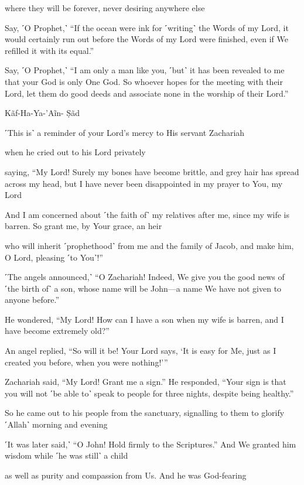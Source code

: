 where they will be forever, never desiring anywhere else

Say, ˹O Prophet,˺ “If the ocean were ink for ˹writing˺ the Words of my Lord, it would certainly run out before the Words of my Lord were finished, even if We refilled it with its equal.”

Say, ˹O Prophet,˺ “I am only a man like you, ˹but˺ it has been revealed to me that your God is only One God. So whoever hopes for the meeting with their Lord, let them do good deeds and associate none in the worship of their Lord.”

Kãf-Ha-Ya-’Aĩn- Ṣãd

˹This is˺ a reminder of your Lord’s mercy to His servant Zachariah

when he cried out to his Lord privately

saying, “My Lord! Surely my bones have become brittle, and grey hair has spread across my head, but I have never been disappointed in my prayer to You, my Lord

And I am concerned about ˹the faith of˺ my relatives after me, since my wife is barren. So grant me, by Your grace, an heir

who will inherit ˹prophethood˺ from me and the family of Jacob, and make him, O Lord, pleasing ˹to You˺!”

˹The angels announced,˺ “O Zachariah! Indeed, We give you the good news of ˹the birth of˺ a son, whose name will be John—a name We have not given to anyone before.”

He wondered, “My Lord! How can I have a son when my wife is barren, and I have become extremely old?”

An angel replied, “So will it be! Your Lord says, ‘It is easy for Me, just as I created you before, when you were nothing!’”

Zachariah said, “My Lord! Grant me a sign.” He responded, “Your sign is that you will not ˹be able to˺ speak to people for three nights, despite being healthy.”

So he came out to his people from the sanctuary, signalling to them to glorify ˹Allah˺ morning and evening

˹It was later said,˺ “O John! Hold firmly to the Scriptures.” And We granted him wisdom while ˹he was still˺ a child

as well as purity and compassion from Us. And he was God-fearing

